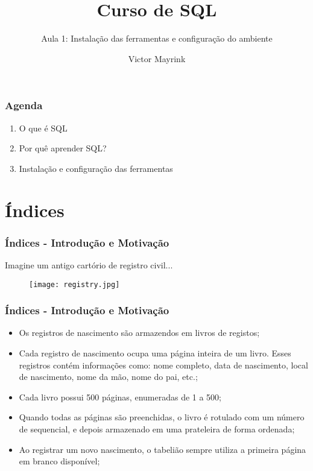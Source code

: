 \documentclass[t, 10pt, aspectratio=169, table, x11names]{beamer}
\begin{document}
	\author{Victor Mayrink}
	\title{Curso de SQL}
	\subtitle{Aula 1: Instalação das ferramentas e configuração do ambiente}

	\begin{frame}[plain]
		\maketitle
	\end{frame}

	\begin{frame}
		\frametitle{Agenda}
		\vspace{1cm}
		\begin{enumerate}
			\large
			\item O que é SQL
			\item Por quê aprender SQL?
			\item Instalação e configuração das ferramentas
		\end{enumerate}
	\end{frame}
	

	\section{Índices}

	\begin{frame}
		\frametitle{Índices - Introdução e Motivação}
		Imagine um antigo cartório de registro civil...
		\bigskip
		\begin{figure}[h]
			\centering
			\texttt{[image: registry.jpg]}
		\end{figure}
	\end{frame}

	\begin{frame}
		\frametitle{Índices - Introdução e Motivação}
		\begin{itemize}
			\item Os registros de nascimento são armazendos em livros de registos;
			\bigskip
			\item Cada registro de nascimento ocupa uma página inteira de um livro. Esses registros contém informações como: nome completo, data de nascimento, local de nascimento, nome da mão, nome do pai, etc.;
			\bigskip
			\item Cada livro possui 500 páginas, enumeradas de 1 a 500;
			\bigskip
			\item Quando todas as páginas são preenchidas, o livro é rotulado com um número de sequencial, e depois armazenado em uma prateleira de forma ordenada;
			\bigskip
			\item Ao registrar um novo nascimento, o tabelião sempre utiliza a primeira página em branco disponível;
		\end{itemize}
	\end{frame}
\end{document}
